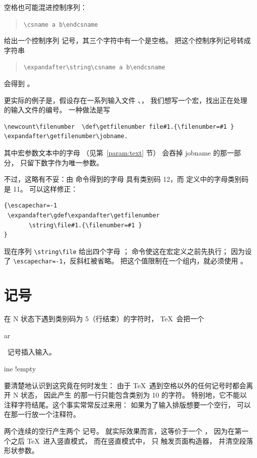 \documentclass[a4paper]{rapport3}
\makeatletter
\newenvironment{disp}{\begin{quotation}}{\end{quotation}}
\def\term#1\par{\index{#1}}
\def\cstoidx#1\par{\index{#1@\cs{#1}}}
\makeatother
\begin{document}
空格也可能混进控制序列：
\begin{disp}\verb>\csname a b\endcsname>\end{disp} 给出一个控制序列
记号，其三个字符中有一个是空格。
把这个控制序列记号转成字符串
\begin{disp}\verb>\expandafter\string\csname a b\endcsname>\end{disp}
会得到 。

更实际的例子是，假设存在一系列输入文件
、\label{ex:jobnumber}，
我们想写一个宏，找出正在处理的输入文件的编号。
一种做法是写
\begin{verbatim}
\newcount\filenumber  \def\getfilenumber file#1.{\filenumber=#1 }
\expandafter\getfilenumber\jobname.
\end{verbatim}
其中宏参数文本中的字母 （见第~\ref{param:text} 节）
会吞掉 jobname 的那一部分，
只留下数字作为唯一参数。

不过，这略有不妥：由  命令得到的字母 
具有类别码 12，而  定义中的字母类别码是 11。
可以这样修正：
\begin{verbatim}
{\escapechar=-1
 \expandafter\gdef\expandafter\getfilenumber
       \string\file#1.{\filenumber=#1 }
}
\end{verbatim}
\awp
现在序列 \verb>\string\file> 给出四个字母
；
 命令使这在宏定义之前先执行；
因为设了 \verb>\escapechar=-1>，反斜杠被省略。
把这个值限制在一个组内，就必须使用 。


\section{\lowercase{} 记号}

在 {\italic N} 状态下遇到类别码为 5（行结束）的字符时，
\TeX\ 会把一个 \cstoidx par\par\ 记号插入输入。
\term line !empty\par
要清楚地认识到这究竟在何时发生：
由于 \TeX\ 遇到空格以外的任何记号时都会离开 {\italic N} 状态，
因此产生  的那一行只能包含类别为 10 的字符。
特别地，它不能以注释字符结尾。这个事实常常反过来用：
如果为了输入排版想要一个空行，
可以在那一行放一个注释符。


两个连续的空行产生两个  记号。
就实际效果而言，这等价于一个 ，
因为在第一个之后 \TeX\ 进入竖直模式，
而在竖直模式中， 只
触发页面构造器，
并清空段落形状参数。
\end{document}
